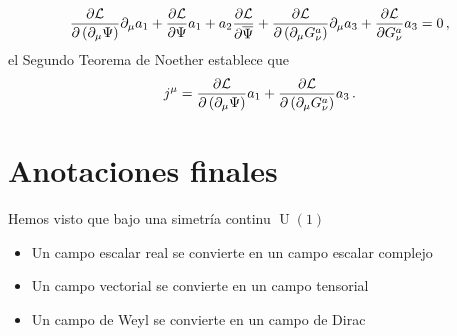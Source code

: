 \begin{align}
 \frac{\partial {\cal L}}{\partial \left( \partial_{\mu}\Psi \right)}\partial_{\mu} a_1
  +\frac{\partial{\cal L}}{\partial\Psi}a_{1}
  +a_{2}\frac{\partial{\cal L}}{\partial\overline{\Psi}}
  +\frac{\partial\mathcal{L}}{\partial\left(\partial_\mu G_\nu^a\right)}\partial_{\mu}a_{3}
  +\frac{\partial\mathcal{L}}{\partial G_\nu^a}a_{3}=0\,,
\end{align}
el Segundo Teorema de Noether establece que
\begin{align}
  j^{\mu}=\frac{\partial {\cal L}}{\partial \left( \partial_{\mu}\Psi \right)}a_{1}+
  \frac{\partial\mathcal{L}}{\partial\left(\partial_\mu G_\nu^a\right)}a_{3}\,.
\end{align}

\section{Anotaciones finales}


Hemos visto que bajo una simetría continu $\operatorname{U}(1)$
\begin{itemize}
 \item Un campo escalar real se convierte en un campo escalar complejo
\item Un campo vectorial se convierte en un campo tensorial
\item Un campo de Weyl se convierte en un campo de Dirac
\end{itemize}




